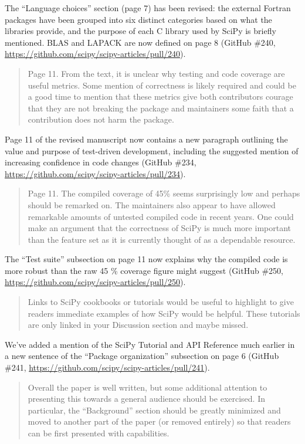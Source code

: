 \documentclass[10pt,stdletter,dateno]{newlfm}
\begin{document}
\begin{newlfm}
The ``Language choices'' section (page 7) has been revised: the external Fortran packages have been grouped into six distinct categories based on what the libraries provide, and the purpose of each C library used by SciPy is briefly mentioned. BLAS and LAPACK are now defined on page 8 (GitHub \#240, \url{https://github.com/scipy/scipy-articles/pull/240}). 

\begin{quote}
Page 11. From the text, it is unclear why testing and code coverage are useful metrics. Some mention of correctness is likely required and could be a good time to mention that these metrics give both contributors courage that they are not breaking the package and maintainers some faith that a contribution does not harm the package.
\end{quote}

Page 11 of the revised manuscript now contains a new paragraph outlining the value and purpose of test-driven development, including the suggested mention of increasing confidence in code changes (GitHub \#234, \url{https://github.com/scipy/scipy-articles/pull/234}). 

\begin{quote}
Page 11. The compiled coverage of 45\% seems surprisingly low and perhaps should be remarked on. The maintainers also appear to have allowed remarkable amounts of untested compiled code in recent years. One could make an argument that the correctness of SciPy is much more important than the feature set as it is currently thought of as a dependable resource.
\end{quote}

The ``Test suite'' subsection on page 11 now explains why the compiled code is more robust than the raw 45 \% coverage figure might suggest (GitHub \#250, \url{https://github.com/scipy/scipy-articles/pull/250}). 

\begin{quote}
Links to SciPy cookbooks or tutorials would be useful to highlight to give readers immediate examples of how SciPy would be helpful. These tutorials are only linked in your Discussion section and maybe missed.
\end{quote}

We've added a mention of the SciPy Tutorial and API Reference much earlier in a new sentence of the ``Package organization'' subsection on page 6 (GitHub \#241, \url{https://github.com/scipy/scipy-articles/pull/241}). 

\begin{quote}
Overall the paper is well written, but some additional attention to presenting this towards a general audience should be exercised. In particular, the “Background” section should be greatly minimized and moved to another part of the paper (or removed entirely) so that readers can be first presented with capabilities.
\end{quote}


\end{newlfm}
\end{document}
